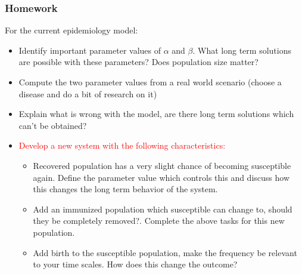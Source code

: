 \documentclass[serif]{beamer}
\begin{document}

\begin{frame}
\frametitle{Homework}
{\tiny
For the current epidemiology model: 
}
\begin{itemize}

\item Identify important parameter values of $\alpha$ and $\beta$. What long term solutions are possible with these parameters? Does population size matter? 
\item Compute the two parameter values from a real world scenario (choose a disease and do a bit of research on it) 
\item Explain what is wrong with the model, are there long term solutions which can't be obtained? 
\item \textcolor{red}{Develop a new system with the following characteristics: }

\begin{itemize}
\item Recovered population has a very slight chance of becoming susceptible again. Define the parameter value which controls this and discuss how this changes the long term behavior of the system. 
\item Add an immunized population which susceptible can change to, should they be completely removed?. Complete the above tasks for this new population. 
\item Add birth to the susceptible population, make the frequency be relevant to your time scales. How does this change the outcome? 
\end{itemize} 
\end{itemize}

\end{frame}

\end{document}
